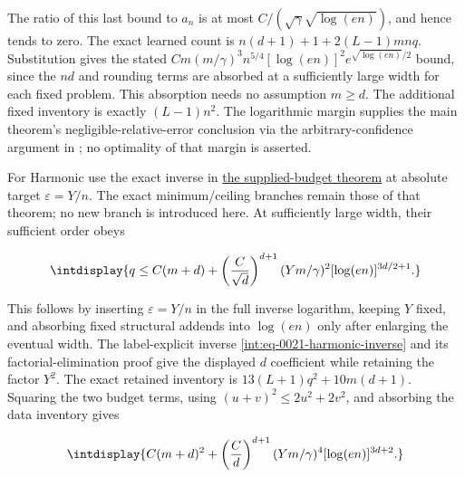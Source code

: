 
The ratio of this last bound to \(a_n\) is at most \(C/(\sqrt\gamma\sqrt{\log(en)})\), and hence tends to zero. The exact learned count is \(n(d+1)+1+2(L-1)mnq\). Substitution gives the stated \(Cm(m/\gamma)^3 n^{5/4}[\log(en)]^2 e^{\sqrt{\log(en)}/2}\) bound, since the \(nd\) and rounding terms are absorbed at a sufficiently large width for each fixed problem. This absorption needs no assumption \(m\ge d\). The additional fixed inventory is exactly \((L-1)n^2\). The logarithmic margin supplies the main theorem's negligible-relative-error conclusion via the arbitrary-confidence argument in ; no optimality of that margin is asserted.



For Harmonic use the exact inverse in \hyperref[int:harmonic-variable-budget-theorem]{the supplied-budget theorem} at absolute target \(\varepsilon=Y/n\). The exact minimum/ceiling branches remain those of that theorem; no new branch is introduced here. At sufficiently large width, their sufficient order obeys


\begingroup\renewcommand{\theHequation}{intdisplay.821}
\begin{equation}
\intdisplay{
q\le C(m+d)+
\left(\frac C{\sqrt d}\right)^{d+1}
(Ym/\gamma)^2[\log(en)]^{3d/2+1}.
}
\label{int:eq-0398-joint-internal-harmonic-budget}
\end{equation}
\endgroup


This follows by inserting \(\varepsilon=Y/n\) in the full inverse
logarithm, keeping \(Y\) fixed, and absorbing fixed structural addends
into \(\log(en)\) only after enlarging the eventual width.
The label-explicit inverse \eqref{int:eq-0021-harmonic-inverse} and
its factorial-elimination proof give the displayed \(d\) coefficient
while retaining the factor \(Y^2\). The exact retained inventory is
\(13(L+1)q^2+10m(d+1)\). Squaring the two budget terms, using
\((u+v)^2\le2u^2+2v^2\), and absorbing the data inventory gives


\begingroup\renewcommand{\theHequation}{intdisplay.822}
\begin{equation}
\intdisplay{
C(m+d)^2+
\left(\frac Cd\right)^{d+1}(Ym/\gamma)^4
[\log(en)]^{3d+2}.
}
\label{int:eq-0399-joint-harmonic-retained-bound}
\end{equation}
\endgroup

